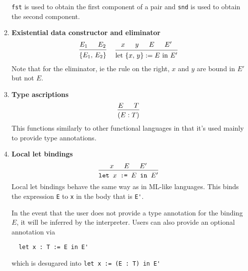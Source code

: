 \documentclass{article}
\begin{document}
\begin{enumerate}
 \verb|fst| is used to obtain the first component of a pair and \verb|snd| is used
 to obtain the second component.

 \item \textbf{Existential data constructor and eliminator} \\
 \begin{gather*}
  \begin{prooftree}
   \hypo{E_1}
   \hypo{E_2}
   \infer2{\{ E_1, \, E_2 \}} 
  \end{prooftree}  
  ~ \quad
 \begin{prooftree}
  \hypo{x}
  \hypo{y}
  \hypo{E}
  \hypo{E'}
  \infer4{\text{let } \{x, \, y\} := E \text{ in } E'}
 \end{prooftree}
 \\ 
\end{gather*}
Note that for the eliminator, ie the rule on the right,
$x$ and $y$ are bound in $E'$ but not $E$.


\item \textbf{Type ascriptions} \\
  \[
    \begin{prooftree}
      \hypo{E}
      \hypo{T}
      \infer2{(E : T)}
    \end{prooftree}
  \]
  This functions similarly to other functional languages in that it's used
  mainly to provide type annotations.

\item \textbf{Local let bindings} \\
\[
  \begin{prooftree}
    \hypo{x}
    \hypo{E}
    \hypo{E'}
    \infer3{\texttt{let } x \texttt{ := } E \texttt{ in } E'}
  \end{prooftree}
\]
Local let bindings behave the same way as in ML-like languages.
This binds the expression \verb|E| to \verb|x| in the body that is \verb|E'|.

In the event that the user does not provide a type annotation for the binding
$E$, it will be inferred by the interpreter. Users can also provide an optional
annotation via
\begin{verbatim}
  let x : T := E in E'
\end{verbatim}

which is desugared into \verb|let x := (E : T) in E'|


\end{enumerate}
\end{document}
